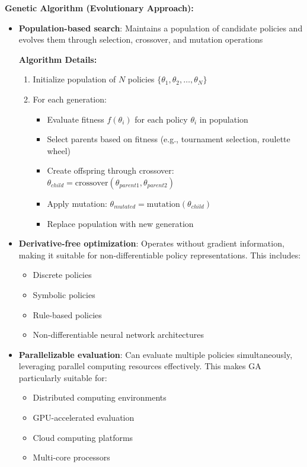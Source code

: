 \documentclass[12pt]{article}
\begin{document}
{{{\textbf{Genetic Algorithm (Evolutionary Approach):}
\begin{itemize}
    \item \textbf{Population-based search}: Maintains a population of candidate policies and evolves them through selection, crossover, and mutation operations
    
    \textbf{Algorithm Details:}
    \begin{enumerate}
        \item Initialize population of $N$ policies $\{\theta_1, \theta_2, \ldots, \theta_N\}$
        \item For each generation:
        \begin{itemize}
            \item Evaluate fitness $f(\theta_i)$ for each policy $\theta_i$ in population
            \item Select parents based on fitness (e.g., tournament selection, roulette wheel)
            \item Create offspring through crossover: $\theta_{child} = \text{crossover}(\theta_{parent1}, \theta_{parent2})$
            \item Apply mutation: $\theta_{mutated} = \text{mutation}(\theta_{child})$
            \item Replace population with new generation
        \end{itemize}
    \end{enumerate}
    
    \item \textbf{Derivative-free optimization}: Operates without gradient information, making it suitable for non-differentiable policy representations. This includes:
    \begin{itemize}
        \item Discrete policies
        \item Symbolic policies
        \item Rule-based policies
        \item Non-differentiable neural network architectures
    \end{itemize}
    
    \item \textbf{Parallelizable evaluation}: Can evaluate multiple policies simultaneously, leveraging parallel computing resources effectively. This makes GA particularly suitable for:
    \begin{itemize}
        \item Distributed computing environments
        \item GPU-accelerated evaluation
        \item Cloud computing platforms
        \item Multi-core processors
    \end{itemize}
    

\end{itemize}}}}
\end{document}
